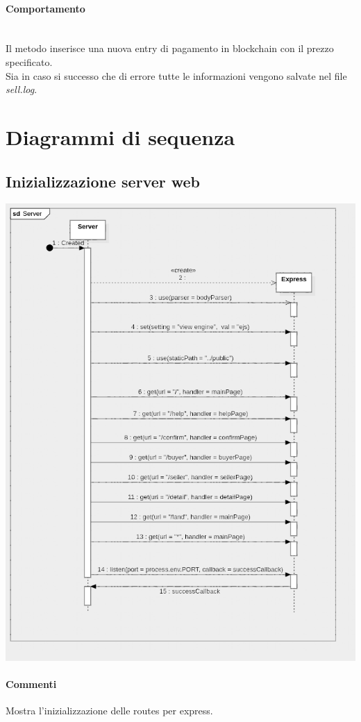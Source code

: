 \documentclass[a4paper, 12pt]{article}
\begin{document}
\paragraph{Comportamento}\\
Il metodo inserisce una nuova entry di pagamento in blockchain con il prezzo specificato.\\
Sia in caso si successo che di errore tutte le informazioni vengono salvate nel file \textit{sell.log}.

\section{Diagrammi di sequenza}
\subsection{Inizializzazione server web}
\includegraphics[width=1.0\textwidth]{server}
\paragraph{Commenti}
Mostra l'inizializzazione delle routes per express.
\end{document}
